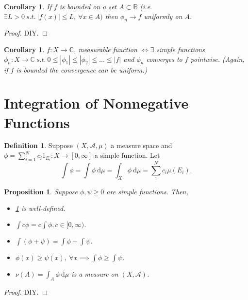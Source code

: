 \documentclass{report}
\newcommand{\R}{\mathbb{R}}
\newcommand{\C}{\mathbb{C}}
\newcommand{\st}{\ s.t.\ }
\newcommand{\cA}{\mathcal{A}}
\newcommand{\df}{\ \mathrm{d}}
\newtheorem{corollary}[theorem]{Corollary}
\newtheorem{proposition}[theorem]{Proposition}
\theoremstyle{definition}
\newtheorem{definition}[theorem]{Definition}
\theoremstyle{remark}
\begin{document}
\begin{corollary}
	If $f$ is bounded on a set $A \subset \R$ (i.e. $\exists L > 0 \st |f(x)| \leq L,\ \forall x \in A)$ then $\phi_n \to f$ uniformly on $A$.
\end{corollary}
\begin{proof}
	DIY.
\end{proof}

\begin{corollary}
	$f: X \to \C$, measurable function $\iff \exists$ simple functions $\phi_n: X \to \C \st 0 \leq |\phi_1| \leq |\phi_2| \leq \ldots \leq |f|$ and $\phi_n$ converges to $f$ pointwise. (Again, if $f$ is bounded the convergence can be uniform.)   
\end{corollary}

\section{Integration of Nonnegative Functions}
\begin{definition}\label{def:nonneg}
	Suppose $(X, \cA, \mu)$ a measure space and $\phi = \sum_{i=1}^N c_i1_{E_i}: X \to [0, \infty]$ a simple function.
	Let \[
		\int \phi = \int \phi \df\mu = \int_X \phi \df \mu = \sum_1^N c_i\mu(E_i).	
	\]
\end{definition}

\begin{proposition}
	Suppose $\phi, \psi \geq 0$ are simple functions. Then, 
	\begin{itemize}
		\item \ref{def:nonneg} is well-defined.
		\item $\displaystyle \int c\phi = c \int \phi, c \in [0, \infty)$.
		\item $\displaystyle \int (\phi + \psi) = \int \phi + \int \psi$.
		\item $\displaystyle \phi(x) \geq \psi(x),\ \forall x \implies \int \phi \geq \int \psi$.
		\item $\displaystyle \nu(A) = \int_A \phi \df \mu$ is a measure on $(X, \cA)$.
	\end{itemize}
\end{proposition}
\begin{proof}
	DIY.
\end{proof}
\end{document}
